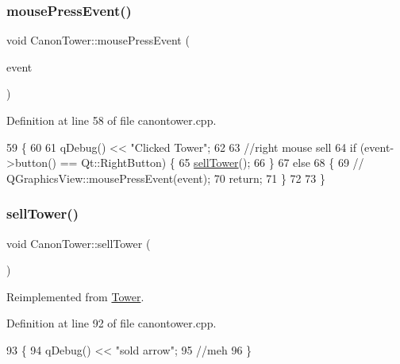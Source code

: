 \subsubsection{\texorpdfstring{mouse\+Press\+Event()}{mousePressEvent()}}
{\footnotesize\ttfamily void Canon\+Tower\+::mouse\+Press\+Event (\begin{DoxyParamCaption}\item[{Q\+Graphics\+Scene\+Mouse\+Event $\ast$}]{event }\end{DoxyParamCaption})}



Definition at line 58 of file canontower.\+cpp.


\begin{DoxyCode}
59 \{
60 
61    qDebug() << \textcolor{stringliteral}{"Clicked Tower"};
62 
63    \textcolor{comment}{//right mouse sell}
64     \textcolor{keywordflow}{if} (event->button() == Qt::RightButton) \{
65         \hyperlink{class_canon_tower_a5bfc0567c8907e8a6ddf4722f6783cd0}{sellTower}();
66     \}
67     \textcolor{keywordflow}{else}
68     \{
69         \textcolor{comment}{//        QGraphicsView::mousePressEvent(event);}
70         \textcolor{keywordflow}{return};
71     \}
72 
73 \}
\end{DoxyCode}
\mbox{\label{class_canon_tower_a5bfc0567c8907e8a6ddf4722f6783cd0}} 
\subsubsection{\texorpdfstring{sell\+Tower()}{sellTower()}}
{\footnotesize\ttfamily void Canon\+Tower\+::sell\+Tower (\begin{DoxyParamCaption}{ }\end{DoxyParamCaption})\hspace{0.3cm}{\ttfamily [virtual]}}



Reimplemented from \hyperlink{class_tower_a7736b1132e64e14a977e9e8c91c3338f}{Tower}.



Definition at line 92 of file canontower.\+cpp.


\begin{DoxyCode}
93 \{
94     qDebug() << \textcolor{stringliteral}{"sold arrow"};
95     \textcolor{comment}{//meh}
96 \}
\end{DoxyCode}


